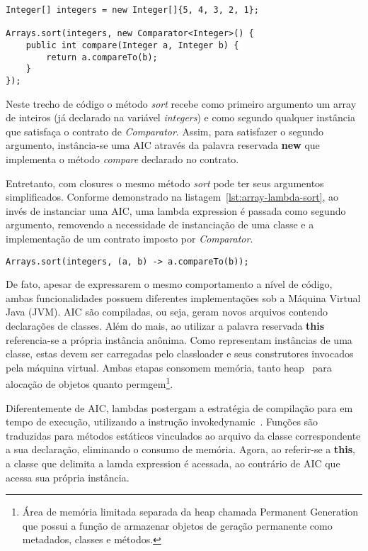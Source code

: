 \documentclass[10pt, conference]{IEEEtran}
\begin{document}
\begin{lstlisting}[caption={Sort - Anonymous Inner Class}, label={lst:array-aic-sort}]
Integer[] integers = new Integer[]{5, 4, 3, 2, 1};

Arrays.sort(integers, new Comparator<Integer>() {
    public int compare(Integer a, Integer b) {
        return a.compareTo(b);
    }
});
\end{lstlisting}

Neste trecho de código o método \textit{sort} recebe como primeiro argumento um array de inteiros (já declarado na variável \textit{integers}) e como segundo qualquer instância que satisfaça o contrato de \textit{Comparator}. Assim, para satisfazer o segundo argumento, instância-se uma AIC através da palavra reservada \textbf{new} que implementa o método \textit{compare} declarado no contrato.

Entretanto, com closures o mesmo método \textit{sort} pode ter seus argumentos simplificados. Conforme demonstrado na listagem~\ref{lst:array-lambda-sort}, ao invés de instanciar uma AIC, uma lambda expression é passada como segundo argumento, removendo a necessidade de instanciação de uma classe e a implementação de um contrato imposto por \textit{Comparator}.

\begin{lstlisting}[caption={Sort - Lambda Expression}, label={lst:array-lambda-sort}]
Arrays.sort(integers, (a, b) -> a.compareTo(b));
\end{lstlisting}

De fato, apesar de expressarem o mesmo comportamento a nível de código, ambas funcionalidades possuem diferentes implementações sob a Máquina Virtual Java (JVM). AIC são compiladas, ou seja, geram novos arquivos contendo declarações de classes. Além do mais, ao utilizar a palavra reservada \textbf{this} referencia-se a própria instância anônima. Como representam instâncias de uma classe, estas devem ser carregadas pelo classloader e seus construtores invocados pela máquina virtual. Ambas etapas consomem memória, tanto heap~\cite{hunt2011java} para alocação de objetos quanto permgem\footnote{Área de memória limitada separada da heap chamada Permanent Generation que possui a função de armazenar objetos de geração permanente como metadados, classes e métodos.}.

Diferentemente de AIC, lambdas postergam a estratégia de compilação para em tempo de execução, utilizando a instrução invokedynamic~\cite{goetz2012translation}. Funções são traduzidas para métodos estáticos vinculados ao arquivo da classe correspondente a sua declaração, eliminando o consumo de memória. Agora, ao referir-se a \textbf{this}, a classe que delimita a lamda expression é acessada, ao contrário de AIC que acessa sua própria instância.
\end{document}
